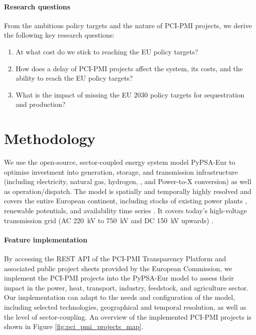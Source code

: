 \documentclass[10pt]{article}
\let\autocite\cite
\begin{document}
\paragraph{Research questions} From the ambitious policy targets and the nature of PCI-PMI projects, we derive the following key research questions:

\begin{enumerate}
    \item At what cost do we stick to reaching the EU policy targets?
    \item How does a delay of PCI-PMI projects affect the system, its costs, and the ability to reach the EU policy targets?
    \item What is the impact of missing the EU 2030 policy targets for  sequestration and  production?
 \end{enumerate}

\section*{Methodology}

We use the open-source, sector-coupled energy system model PyPSA-Eur \cite{neumannPotentialRoleHydrogen2023,frysztackiComparisonClusteringMethods2022,glaumOffshorePowerHydrogen2024,horschPyPSAEurOpenOptimisation2018} to optimise investment into generation, storage, and transmission infrastructure (including electricity, natural gas, hydrogen, , and Power-to-X conversion) as well as operation/dispatch. The model is spatially and temporally highly resolved and covers the entire European continent, including stocks of existing power plants \autocite{gotzensPerformingEnergyModelling2019}, renewable potentials, and availability time series \autocite{hofmannAtliteLightweightPython2021}. It covers today's high-voltage transmission grid (AC \SI{220}{kV} to \SI{750}{kV} and DC \SI{150}{kV} upwards) \autocite{xiongModellingHighVoltageGrid2024}.

\paragraph{Feature implementation} By accessing the REST API of the PCI-PMI Transparency Platform \autocite{europeancommissionPCIPMITransparencyPlatform2024} and associated public project sheets provided by the European Commission, we implement the PCI-PMI projects into the PyPSA-Eur model to assess their impact in the power, heat, transport, industry, feedstock, and agriculture sector. Our implementation can adapt to the needs and configuration of the model, including selected technologies, geographical and temporal resolution, as well as the level of sector-coupling. An overview of the implemented PCI-PMI projects is shown in Figure \ref{fig:pci_pmi_projects_map}.
\end{document}

